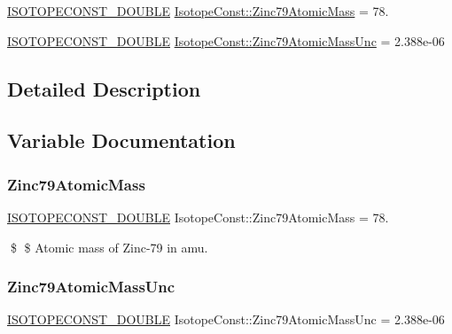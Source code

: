 \begin{DoxyCompactItemize}
\item 
\mbox{\hyperlink{group___isotope_const-_macros_ga8f45a7272ce02c0b4c65c44636ed719a}{I\+S\+O\+T\+O\+P\+E\+C\+O\+N\+S\+T\+\_\+\+D\+O\+U\+B\+LE}} \mbox{\hyperlink{group___isotope_const-_zinc-_zn79_gafcbf94f00f5b0d6170a2dcc55258f415}{Isotope\+Const\+::\+Zinc79\+Atomic\+Mass}} = 78.
\item 
\mbox{\hyperlink{group___isotope_const-_macros_ga8f45a7272ce02c0b4c65c44636ed719a}{I\+S\+O\+T\+O\+P\+E\+C\+O\+N\+S\+T\+\_\+\+D\+O\+U\+B\+LE}} \mbox{\hyperlink{group___isotope_const-_zinc-_zn79_gac6e66ded5c31098cabbaba7c9b01407c}{Isotope\+Const\+::\+Zinc79\+Atomic\+Mass\+Unc}} = 2.\+388e-\/06
\end{DoxyCompactItemize}


\subsection{Detailed Description}


\subsection{Variable Documentation}
\mbox{\label{group___isotope_const-_zinc-_zn79_gafcbf94f00f5b0d6170a2dcc55258f415}} 
\subsubsection{\texorpdfstring{Zinc79\+Atomic\+Mass}{Zinc79AtomicMass}}
{\footnotesize\ttfamily \mbox{\hyperlink{group___isotope_const-_macros_ga8f45a7272ce02c0b4c65c44636ed719a}{I\+S\+O\+T\+O\+P\+E\+C\+O\+N\+S\+T\+\_\+\+D\+O\+U\+B\+LE}} Isotope\+Const\+::\+Zinc79\+Atomic\+Mass = 78.}

\$ \$ Atomic mass of Zinc-\/79 in amu. \mbox{\label{group___isotope_const-_zinc-_zn79_gac6e66ded5c31098cabbaba7c9b01407c}} 
\subsubsection{\texorpdfstring{Zinc79\+Atomic\+Mass\+Unc}{Zinc79AtomicMassUnc}}
{\footnotesize\ttfamily \mbox{\hyperlink{group___isotope_const-_macros_ga8f45a7272ce02c0b4c65c44636ed719a}{I\+S\+O\+T\+O\+P\+E\+C\+O\+N\+S\+T\+\_\+\+D\+O\+U\+B\+LE}} Isotope\+Const\+::\+Zinc79\+Atomic\+Mass\+Unc = 2.\+388e-\/06}


